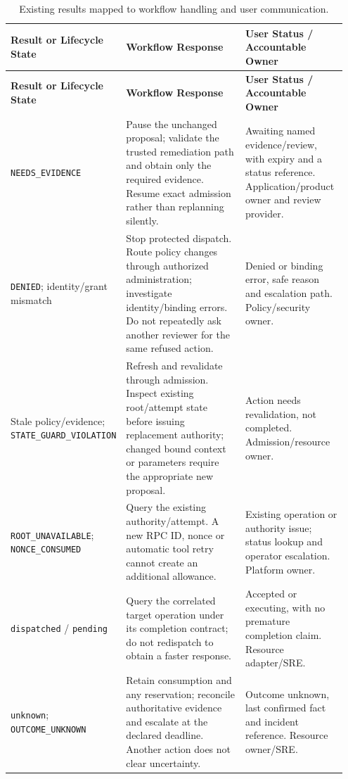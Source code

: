 {\small
\begin{longtable}{@{}L{0.22\linewidth}L{0.42\linewidth}L{0.31\linewidth}@{}}
\caption{Existing results mapped to workflow handling and user communication.}
\label{tab:adoption-handling}\\
\toprule
\textbf{Result or Lifecycle State} & \textbf{Workflow Response} & \textbf{User Status / Accountable Owner}\\
\midrule
\endfirsthead
\toprule
\textbf{Result or Lifecycle State} & \textbf{Workflow Response} & \textbf{User Status / Accountable Owner}\\
\midrule
\endhead
\bottomrule
\endfoot
\nolinkurl{NEEDS_EVIDENCE} & Pause the unchanged proposal; validate the trusted remediation path and obtain only the required evidence. Resume exact admission rather than replanning silently. & Awaiting named evidence/review, with expiry and a status reference. Application/product owner and review provider.\\
\addlinespace
\nolinkurl{DENIED}; identity/grant mismatch & Stop protected dispatch. Route policy changes through authorized administration; investigate identity/binding errors. Do not repeatedly ask another reviewer for the same refused action. & Denied or binding error, safe reason and escalation path. Policy/security owner.\\
\addlinespace
Stale policy/evidence; \nolinkurl{STATE_GUARD_VIOLATION} & Refresh and revalidate through admission. Inspect existing root/attempt state before issuing replacement authority; changed bound context or parameters require the appropriate new proposal. & Action needs revalidation, not completed. Admission/resource owner.\\
\addlinespace
\nolinkurl{ROOT_UNAVAILABLE}; \nolinkurl{NONCE_CONSUMED} & Query the existing authority/attempt. A new RPC ID, nonce or automatic tool retry cannot create an additional allowance. & Existing operation or authority issue; status lookup and operator escalation. Platform owner.\\
\addlinespace
\texttt{dispatched} / \texttt{pending} & Query the correlated target operation under its completion contract; do not redispatch to obtain a faster response. & Accepted or executing, with no premature completion claim. Resource adapter/SRE.\\
\addlinespace
\texttt{unknown}; \nolinkurl{OUTCOME_UNKNOWN} & Retain consumption and any reservation; reconcile authoritative evidence and escalate at the declared deadline. Another action does not clear uncertainty. & Outcome unknown, last confirmed fact and incident reference. Resource owner/SRE.\\

\end{longtable}}
